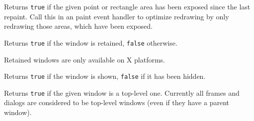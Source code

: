 


\label{wxwindowisexposed}





Returns {\tt true} if the given point or rectangle area has been exposed since the
last repaint. Call this in an paint event handler to optimize redrawing by
only redrawing those areas, which have been exposed.



\label{wxwindowisretained}


Returns {\tt true} if the window is retained, {\tt false} otherwise.


Retained windows are only available on X platforms.


\label{wxwindowisshown}


Returns {\tt true} if the window is shown, {\tt false} if it has been hidden.


\label{wxwindowistoplevel}


Returns {\tt true} if the given window is a top-level one. Currently all frames and
dialogs are considered to be top-level windows (even if they have a parent
window).


\label{wxwindowlayout}

